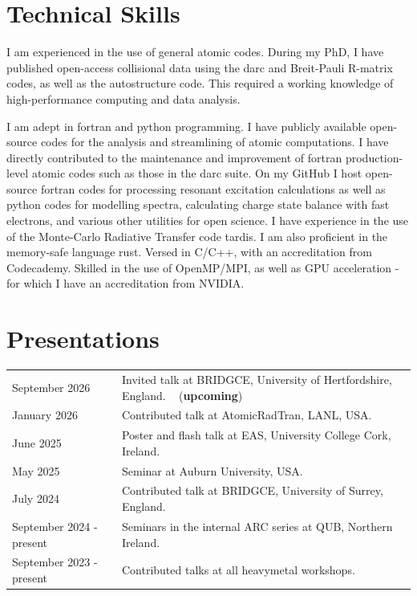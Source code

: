 \documentclass[a4paper,11pt]{article}
\begin{document}
\section{Technical Skills}

I am experienced in the use of general atomic codes. During my PhD, I have published open-access collisional data using the {\sc darc} and Breit-Pauli R-matrix codes, as well as the {\sc autostructure} code. This required a working knowledge of high-performance computing and data analysis.

I am adept in {\sc fortran} and {\sc python} programming. I have publicly available open-source codes for the analysis and streamlining of atomic computations. I have directly contributed to the maintenance and improvement of {\sc fortran} production-level atomic codes such as those in the {\sc darc} suite. On my GitHub I host open-source {\sc fortran} codes for processing resonant excitation calculations as well as {\sc python} codes for modelling spectra, calculating charge state balance with fast electrons, and various other utilities for open science. I have experience in the use of the Monte-Carlo Radiative Transfer code {\sc tardis}. I am also proficient in the memory-safe language {\sc rust}. Versed in C/C++, with an accreditation from Codecademy. Skilled in the use of OpenMP/MPI, as well as GPU acceleration -  for which I have an accreditation from NVIDIA.

\section{Presentations}

\begin{tabularx}{\linewidth}{@{}l X@{}}	
September 2026 &  Invited  talk at BRIDGCE, University of Hertfordshire, England. ~ (\textbf{upcoming})\\
January 2026 & Contributed talk at AtomicRadTran, LANL, USA.  \\
June 2025 & Poster and flash talk at EAS, University College Cork, Ireland. \\ 
May 2025 & Seminar at Auburn University, USA. \\ 
July 2024 & Contributed talk at BRIDGCE, University of Surrey, England. \\
September 2024 - present & Seminars in the internal ARC series at QUB, Northern Ireland. \\
September 2023 - present & Contributed talks at all {\sc heavymetal} workshops.
\end{tabularx}
\end{document}
